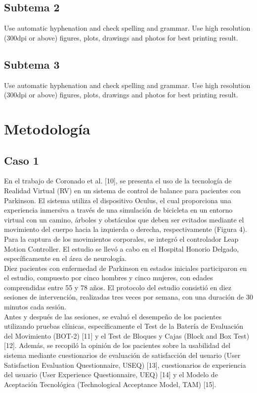 \subsection{Subtema 2}
Use automatic hyphenation and check spelling and grammar. Use high resolution (300dpi or above) figures, plots, drawings and photos for best printing result.

\subsection{Subtema 3}
Use automatic hyphenation and check spelling and grammar. Use high resolution (300dpi or above) figures, plots, drawings and photos for best printing result.

\section{Metodología}

\subsection{Caso 1}

En el trabajo de Coronado et al. [10], se presenta el uso de la tecnología de Realidad Virtual (RV) en un sistema de control de balance para pacientes con Parkinson. El sistema utiliza el dispositivo Oculus, el cual proporciona una experiencia inmersiva a través de una simulación de bicicleta en un entorno virtual con un camino, árboles y obstáculos que deben ser evitados mediante el movimiento del cuerpo hacia la izquierda o derecha, respectivamente (Figura 4). Para la captura de los movimientos corporales, se integró el controlador Leap Motion Controller. El estudio se llevó a cabo en el Hospital Honorio Delgado, específicamente en el área de neurología.\\

Diez pacientes con enfermedad de Parkinson en estados iniciales participaron en el estudio, compuesto por cinco hombres y cinco mujeres, con edades comprendidas entre 55 y 78 años. El protocolo del estudio consistió en diez sesiones de intervención, realizadas tres veces por semana, con una duración de 30 minutos cada sesión.\\

Antes y después de las sesiones, se evaluó el desempeño de los pacientes utilizando pruebas clínicas, específicamente el Test de la Batería de Evaluación del Movimiento (BOT-2) [11] y el Test de Bloques y Cajas (Block and Box Test) [12]. Además, se recopiló la opinión de los pacientes sobre la usabilidad del sistema mediante cuestionarios de evaluación de satisfacción del usuario (User Satisfaction Evaluation Questionnaire, USEQ) [13], cuestionarios de experiencia del usuario (User Experience Questionnaire, UEQ) [14] y el Modelo de Aceptación Tecnológica (Technological Acceptance Model, TAM) [15].\\

